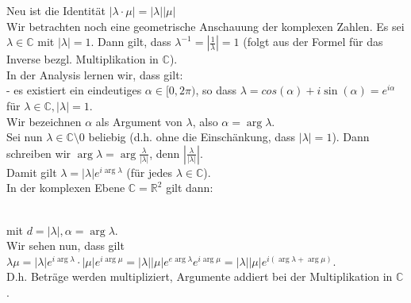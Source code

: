 \documentclass{scrartcl}
\newcommand{\lb}{\lambda}
\newcommand{\R}{\mathbb{R}}
\newcommand{\C}{\mathbb{C}}
\newcommand{\mR}{\(\mathbb{R}\)}
\newcommand{\mC}{\(\mathbb{C}\)}
\newcommand{\al}{\alpha}
\begin{document}
\begin{enumerate}
{Neu ist die Identit\"at \(|\lb \cdot \mu| = |\lb| |\mu|\)\\
Wir betrachten noch eine geometrische Anschauung der komplexen Zahlen. Es sei \(\lb \in \C\) mit \(|\lb| = 1\). Dann gilt, dass \(\lb^{-1} = |\frac{1}{\lb}| = 1\)  (folgt aus der Formel f\"ur das Inverse bezgl. Multiplikation in \mC).\\
In der Analysis lernen wir, dass gilt:\\
- es existiert ein eindeutiges \(\al \in [0, 2\pi)\), so dass \(\lb = cos(\al) + i \sin(\al) = e^{i\al}\) f\"ur \(\lb \in \C, |\lb| = 1\).\\
Wir bezeichnen \(\al\) als Argument von \(\lb\), also \(\al = \arg \lb\).\\
Sei nun \(\lb \in \C \setminus 0\) beliebig (d.h. ohne die Einsch\"ankung, dass \(|\lb| = 1\)). Dann schreiben wir \(\arg \lb = \arg \frac{\lb}{|\lb|}\), denn \(|\frac{\lb}{|\lb|}|\).\\
Damit gilt \(\lb = |\lb| e^{i \arg \lb}\) (f\"ur jedes \(\lb \in \C\)).\\
In der komplexen Ebene \(\C = \R^2\) gilt dann:\\
\\
mit \(d = |\lb|, \al = \arg \lb\).\\
Wir sehen nun, dass gilt \(\lb \mu = |\lb| e^{i \arg \lb} \cdot  |\mu| e^{i \arg \mu} = |\lb||\mu| e^{e \arg\lb} e^{i \arg \mu} = |\lb||\mu| e^{i (\arg\lb + \arg \mu)}\).\\
D.h. Betr\"age werden multipliziert, Argumente addiert bei der Multiplikation in \mC.
}
\end{enumerate}
\end{document}
